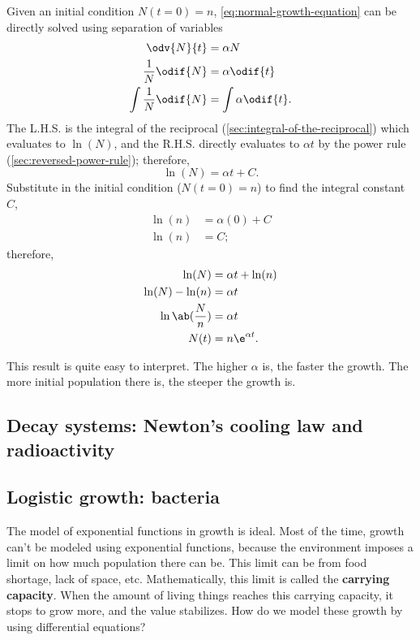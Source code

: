 Given an initial condition $N(t = 0) = n$, \cref{eq:normal-growth-equation} can be directly solved using separation of variables
\begin{align}
	\odv{N}{t}              & = \alpha N             \\
	\frac{1}{N}\odif{N}     & = \alpha\odif{t}       \\
	\int\frac{1}{N}\odif{N} & = \int \alpha\odif{t}.
\end{align}
The L.H.S. is the integral of the reciprocal (\cref{sec:integral-of-the-reciprocal}) which evaluates to $\ln(N)$, and the R.H.S. directly evaluates to $\alpha t$ by the power rule (\cref{sec:reversed-power-rule}); therefore,
\begin{equation}
	\ln(N) = \alpha t + C.
\end{equation}
Substitute in the initial condition ($N(t = 0) = n$) to find the integral constant $C$,
\begin{align}
	\ln(n) & = \alpha(0) + C \\
	\ln(n) & = C;
\end{align}
therefore,
\begin{align}
	\ln(N)              & = \alpha t + \ln(n) \\
	\ln(N) - \ln(n)     & = \alpha t          \\
	\ln\ab(\frac{N}{n}) & = \alpha t          \\
	N(t)                & = n\e^{\alpha t}.
\end{align}

This result is quite easy to interpret. The higher $\alpha$ is, the faster the growth. The more initial population there is, the steeper the growth is.

\subsection{Decay systems: Newton's cooling law and radioactivity}

\subsection{Logistic growth: bacteria}

The model of exponential functions in growth is ideal. Most of the time, growth can't be modeled using exponential functions, because the environment imposes a limit on how much population there can be. This limit can be from food shortage, lack of space, etc. Mathematically, this limit is called the \textbf{carrying capacity}. When the amount of living things reaches this carrying capacity, it stops to grow more, and the value stabilizes. How do we model these growth by using differential equations?

